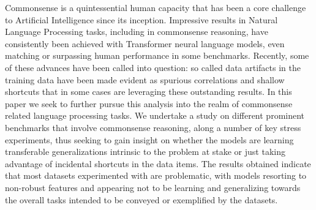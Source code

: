 Commonsense is a quintessential human capacity that has been a core challenge to Artificial Intelligence since its inception. Impressive results in Natural Language Processing tasks, including in commonsense reasoning, have consistently been achieved with Transformer neural language models, even matching or surpassing human performance in some benchmarks. Recently, some of these advances have been called into question: so called data artifacts in the training data have been made evident as spurious correlations and shallow shortcuts that in some cases are leveraging these outstanding results. In this paper we seek to further pursue this analysis into the realm of commonsense related language processing tasks. We undertake a study on different prominent benchmarks that involve commonsense reasoning, along a number of key stress experiments, thus seeking to gain insight on whether the models are learning transferable generalizations intrinsic to the problem at stake or just taking advantage of incidental shortcuts in the data items. The results obtained indicate that most datasets experimented with are problematic, with models resorting to non-robust features and appearing not to be learning and generalizing towards the overall tasks intended to be conveyed or exemplified by the datasets.
